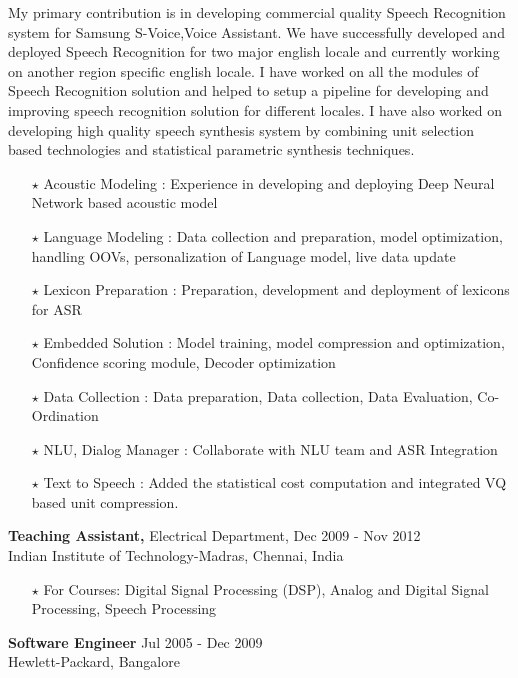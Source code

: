 \documentclass[line,margin]{res}
\begin{document}
\begin{resume}
My primary contribution is in developing commercial quality Speech Recognition system for Samsung S-Voice,Voice Assistant. We have successfully developed and deployed Speech Recognition for two major english locale and currently working on another region specific english locale. I have worked on all the modules of Speech Recognition solution and helped to setup a pipeline for developing and improving speech recognition solution for different locales. I have also worked on developing high quality speech synthesis system by combining unit selection based technologies and statistical parametric synthesis techniques.

\begin{itemize} \itemsep -1pt  %
\small
	\item[$\star$] Acoustic Modeling   : Experience in developing and deploying Deep Neural Network based acoustic model
	\item[$\star$] Language Modeling   : Data collection and preparation, model optimization, handling OOVs, personalization of Language model, live data update
	\item[$\star$] Lexicon Preparation : Preparation, development and deployment of lexicons for ASR
	\item[$\star$] Embedded Solution   : Model training, model compression and optimization, Confidence scoring module, Decoder optimization
	\item[$\star$] Data Collection 	   : Data preparation, Data collection, Data Evaluation, Co-Ordination
	\item[$\star$] NLU, Dialog Manager : Collaborate with NLU team and ASR Integration
	\item[$\star$] Text to Speech      : Added the statistical cost computation and integrated VQ based unit compression.
\end{itemize}

\normalsize
  {\bf Teaching Assistant,} Electrical Department, \hfill Dec 2009 - Nov 2012\\
 \hfill Indian Institute of Technology-Madras, Chennai, India
 
\begin{itemize} \itemsep -2pt  %
\small
	\item[$\star$] For Courses: Digital Signal Processing (DSP), Analog and Digital Signal Processing, Speech Processing
\end{itemize}

\normalsize
 {\bf Software Engineer} \hfill Jul 2005 - Dec 2009\\
 \hfill Hewlett-Packard, Bangalore


\end{resume}
\end{document}
